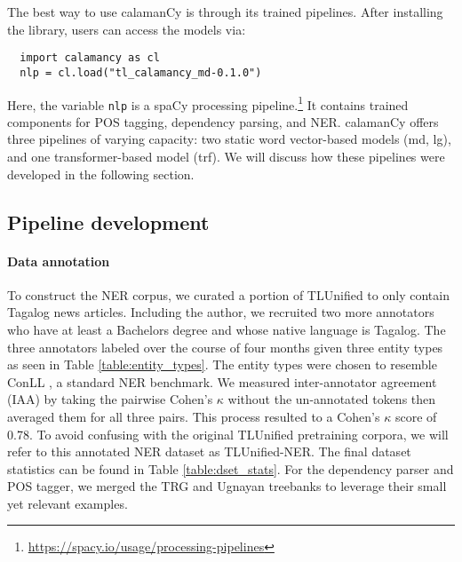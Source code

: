 \documentclass[11pt]{article}
\begin{document}
The best way to use calamanCy is through its trained pipelines.
After installing the library, users can access the models via:

\begin{verbatim}
  import calamancy as cl
  nlp = cl.load("tl_calamancy_md-0.1.0")
\end{verbatim}

Here, the variable \texttt{nlp} is a spaCy processing pipeline.\footnote[2]{\url{https://spacy.io/usage/processing-pipelines}}
It contains trained components for POS tagging, dependency parsing, and NER.
calamanCy offers three pipelines of varying capacity: two static word vector-based models (md, lg), and one transformer-based model (trf).
We will discuss how these pipelines were developed in the following section.

\subsection{Pipeline development}

\paragraph*{Data annotation}
To construct the NER corpus, we curated a portion of TLUnified \citep{Cruz2021ImprovingLL} to only contain Tagalog news articles.
Including the author, we recruited two more annotators who have at least a Bachelors degree and whose native language is Tagalog.
The three annotators labeled over the course of four months given three entity types as seen in Table \ref{table:entity_types}.
The entity types were chosen to resemble ConLL \citep{Sang2002IntroductionTT,Sang2003IntroductionTT}, a standard NER benchmark.
We measured inter-annotator agreement (IAA) by taking the pairwise Cohen's $\kappa$ without the un-annotated tokens then averaged them for all three pairs.
This process resulted to a Cohen's $\kappa$ score of 0.78. 
To avoid confusing with the original TLUnified pretraining corpora, we will refer to this annotated NER dataset as TLUnified-NER.
The final dataset statistics can be found in Table \ref{table:dset_stats}.
For the dependency parser and POS tagger, we merged the TRG \citep{Samson2018TRG} and Ugnayan \citep{Aquino2020ParsingIT} treebanks to leverage their small yet relevant examples.






\end{document}
